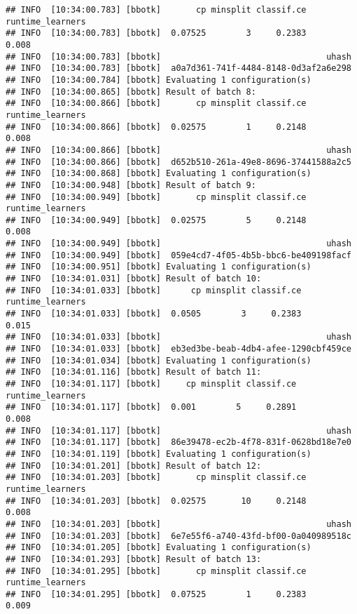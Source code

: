 \documentclass[
]{scrbook}
\begin{document}
\begin{verbatim}
## INFO  [10:34:00.783] [bbotk]       cp minsplit classif.ce runtime_learners 
## INFO  [10:34:00.783] [bbotk]  0.07525        3     0.2383            0.008 
## INFO  [10:34:00.783] [bbotk]                                 uhash 
## INFO  [10:34:00.783] [bbotk]  a0a7d361-741f-4484-8148-0d3af2a6e298 
## INFO  [10:34:00.784] [bbotk] Evaluating 1 configuration(s) 
## INFO  [10:34:00.865] [bbotk] Result of batch 8: 
## INFO  [10:34:00.866] [bbotk]       cp minsplit classif.ce runtime_learners 
## INFO  [10:34:00.866] [bbotk]  0.02575        1     0.2148            0.008 
## INFO  [10:34:00.866] [bbotk]                                 uhash 
## INFO  [10:34:00.866] [bbotk]  d652b510-261a-49e8-8696-37441588a2c5 
## INFO  [10:34:00.868] [bbotk] Evaluating 1 configuration(s) 
## INFO  [10:34:00.948] [bbotk] Result of batch 9: 
## INFO  [10:34:00.949] [bbotk]       cp minsplit classif.ce runtime_learners 
## INFO  [10:34:00.949] [bbotk]  0.02575        5     0.2148            0.008 
## INFO  [10:34:00.949] [bbotk]                                 uhash 
## INFO  [10:34:00.949] [bbotk]  059e4cd7-4f05-4b5b-bbc6-be409198facf 
## INFO  [10:34:00.951] [bbotk] Evaluating 1 configuration(s) 
## INFO  [10:34:01.031] [bbotk] Result of batch 10: 
## INFO  [10:34:01.033] [bbotk]      cp minsplit classif.ce runtime_learners 
## INFO  [10:34:01.033] [bbotk]  0.0505        3     0.2383            0.015 
## INFO  [10:34:01.033] [bbotk]                                 uhash 
## INFO  [10:34:01.033] [bbotk]  eb3ed3be-beab-4db4-afee-1290cbf459ce 
## INFO  [10:34:01.034] [bbotk] Evaluating 1 configuration(s) 
## INFO  [10:34:01.116] [bbotk] Result of batch 11: 
## INFO  [10:34:01.117] [bbotk]     cp minsplit classif.ce runtime_learners 
## INFO  [10:34:01.117] [bbotk]  0.001        5     0.2891            0.008 
## INFO  [10:34:01.117] [bbotk]                                 uhash 
## INFO  [10:34:01.117] [bbotk]  86e39478-ec2b-4f78-831f-0628bd18e7e0 
## INFO  [10:34:01.119] [bbotk] Evaluating 1 configuration(s) 
## INFO  [10:34:01.201] [bbotk] Result of batch 12: 
## INFO  [10:34:01.203] [bbotk]       cp minsplit classif.ce runtime_learners 
## INFO  [10:34:01.203] [bbotk]  0.02575       10     0.2148            0.008 
## INFO  [10:34:01.203] [bbotk]                                 uhash 
## INFO  [10:34:01.203] [bbotk]  6e7e55f6-a740-43fd-bf00-0a040989518c 
## INFO  [10:34:01.205] [bbotk] Evaluating 1 configuration(s) 
## INFO  [10:34:01.293] [bbotk] Result of batch 13: 
## INFO  [10:34:01.295] [bbotk]       cp minsplit classif.ce runtime_learners 
## INFO  [10:34:01.295] [bbotk]  0.07525        1     0.2383            0.009 

\end{verbatim}
\end{document}
